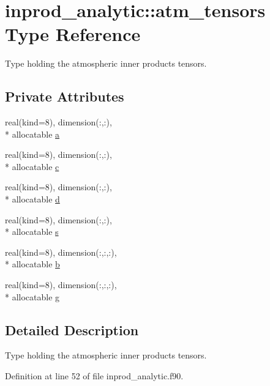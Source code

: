 \hypertarget{structinprod__analytic_1_1atm__tensors}{\section{inprod\-\_\-analytic\-:\-:atm\-\_\-tensors Type Reference}
\label{structinprod__analytic_1_1atm__tensors}
}


Type holding the atmospheric inner products tensors.  


\subsection*{Private Attributes}
\begin{DoxyCompactItemize}
\item 
real(kind=8), dimension(\-:,\-:), \\*
allocatable \hyperlink{structinprod__analytic_1_1atm__tensors_af50962da7a48c98d8b118dee9cc16dcd}{a}
\item 
real(kind=8), dimension(\-:,\-:), \\*
allocatable \hyperlink{structinprod__analytic_1_1atm__tensors_a6f560bb68ce7081409034cb755e7a164}{c}
\item 
real(kind=8), dimension(\-:,\-:), \\*
allocatable \hyperlink{structinprod__analytic_1_1atm__tensors_a00e06ac193f03e4dcd337439cc489f78}{d}
\item 
real(kind=8), dimension(\-:,\-:), \\*
allocatable \hyperlink{structinprod__analytic_1_1atm__tensors_ad95a5329b72aae59807e7cdf043ab52c}{s}
\item 
real(kind=8), dimension(\-:,\-:,\-:), \\*
allocatable \hyperlink{structinprod__analytic_1_1atm__tensors_aa6b446e5bd3e7ea7278f1c1cad7f46cf}{b}
\item 
real(kind=8), dimension(\-:,\-:,\-:), \\*
allocatable \hyperlink{structinprod__analytic_1_1atm__tensors_a9b4ecfbc139ac739d5ec82b087e421a5}{g}
\end{DoxyCompactItemize}


\subsection{Detailed Description}
Type holding the atmospheric inner products tensors. 

Definition at line 52 of file inprod\-\_\-analytic.\-f90.



